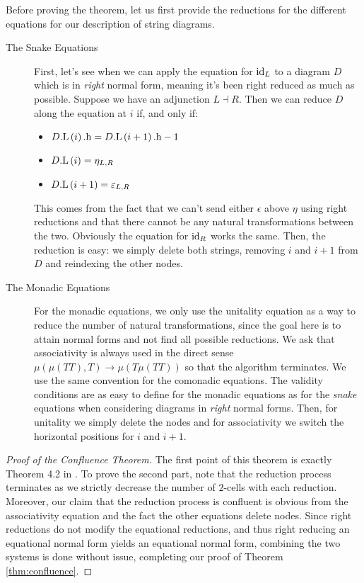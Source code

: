 Before proving the theorem, let us first provide the reductions for the different
equations for our description of string diagrams.
\begin{description}
	\item[The Snake Equations]
	      First, let's see when we can apply the equation for $\mathrm{id}_{L}$ to a
	      diagram $D$ which is in \emph{right} normal form, meaning it's been
	      right reduced as much as possible.
	      Suppose we have an adjunction $L \dashv R$.
	      Then we can reduce $D$ along the equation at $i$ if, and only if:
	      \begin{itemize}
		      \item $D\mathrm{.L}\left(i\right)\mathrm{.h} = D\mathrm{.L}\left(i + 1\right)\mathrm{.h} - 1$
		      \item $D\mathrm{.L}\left(i\right) = \eta_{L, R}$
		      \item $D\mathrm{.L}\left(i + 1\right) = \varepsilon_{L, R}$
	      \end{itemize}
	      This comes from the fact that we can't send either $\epsilon$
	      above $\eta$ using right reductions and
	      that there cannot be any natural transformations between the two.
	      Obviously the equation for $\mathrm{id}_{R}$ works the same.
	      Then, the reduction is easy: we simply delete both strings,
	      removing $i$ and $i + 1$ from $D$ and reindexing the other nodes.
	\item[The Monadic Equations] For the monadic equations, we only use
	      the unitality equation as a way to reduce the number of natural
	      transformations, since the goal here is to attain normal forms
	      and not find all possible reductions.
	      We ask that associativity is always used in the direct
	      sense $\mu\left( \mu\left( TT \right),T \right) \to \mu\left(
		      T\mu\left( TT \right) \right)$ so that the algorithm terminates.
	      We use the same convention for the comonadic equations.
	      The validity conditions are as easy to define for the monadic
	      equations as for the \emph{snake} equations when considering
	      diagrams in \emph{right} normal forms.
	      Then, for unitality we simply delete the nodes
	      and for associativity we switch the horizontal
	      positions for $i$ and $i + 1$.
\end{description}

\begin{proof}[Proof of the Confluence Theorem]
	The first point of this theorem is exactly Theorem 4.2
	in \cite{delpeuchNormalizationPlanarString2022}.
	To prove the second part, note that the reduction process terminates as
	we strictly decrease the number of $2$-cells with each reduction.
	Moreover, our claim that the reduction process is confluent is obvious
	from the associativity equation and the fact the other
	equations delete nodes.
	Since right reductions do not modify the equational reductions, and thus
	right reducing an equational normal form yields an equational normal form,
	combining the two systems is done without issue, completing our proof of
	Theorem \ref{thm:confluence}.
\end{proof}

